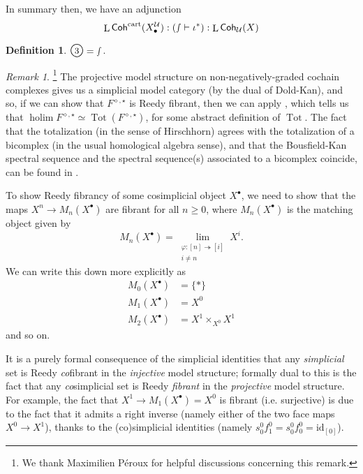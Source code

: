 \documentclass[11pt,fleqn]{article}
\theoremstyle{plain}
\theoremstyle{definition}
\newtheorem{definition}[theorem]{Definition}
\theoremstyle{remark}
\newtheorem{remark}[theorem]{Remark}
\numberwithin{equation}{theorem}
\newcommand{\cover}{\mathcal{U}}
\newcommand{\anotherbullet}{\star}
\newcommand{\yetanotherbullet}{\diamond}
\newcommand{\id}{\mathrm{id}}
\newcommand{\gcohUX}{\mathsf{Coh}_{\cover}(X)}
\newcommand{\cartcohX}{\mathsf{Coh}^\mathrm{cart}(X_\bullet^\cover)}
\newcommand{\numberincircle}[1]{\text{\normalfont\Large\textcircled{\small #1}}}
\DeclareMathOperator{\Tot}{Tot}
\DeclareMathOperator{\LL}{L}
\DeclareMathOperator{\holim}{holim}
\begin{document}
        \medskip

        In summary then, we have an adjunction
        \begin{equation}
        \label{equation:adjunction-of-localisations}
            \LL{\cartcohX}:(\smallint\vdash\iota^*):\LL{\gcohUX}
        \end{equation}

        \begin{definition}\label{definition:defining-numberincircle3}
            $\numberincircle{3}=\smallint$.
        \end{definition}

        \begin{remark}\label{remark:reedy-totalisation-etc}\footnote{We thank Maximilien Péroux for helpful discussions concerning this remark.}
            The projective model structure on non-negatively-graded cochain complexes gives us a simplicial model category (by the dual of Dold-Kan), and so, if we can show that $F^{\yetanotherbullet,\anotherbullet}$ is Reedy fibrant, then we can apply \cite[Theorem~19.8.7]{Hirschhorn2003}, which tells us that $\holim F^{\yetanotherbullet,\anotherbullet}\simeq\Tot(F^{\yetanotherbullet,\anotherbullet})$, for some abstract definition of $\Tot$.
            The fact that the totalization (in the sense of Hirschhorn) agrees with the totalization of a bicomplex (in the usual homological algebra sense), and that the Bousfield-Kan spectral sequence and the spectral sequence(s) associated to a bicomplex coincide, can be found in \cite[{}III.1.1.13]{Fresse2017}.

            To show Reedy fibrancy of some cosimplicial object $X^\bullet$, we need to show that the maps $X^n\to M_n(X^\bullet)$ are fibrant for all $n\geqslant0$, where $M_n(X^\bullet)$ is the {matching object} given by
            \[
                M_n(X^\bullet)
                =
                \lim_{\substack{\varphi\colon[n]\twoheadrightarrow[i] \\ i\neq n}} X^i.
            \]
            We can write this down more explicitly as
            \begin{align*}
                M_0(X^\bullet)
                &=
                \{*\}
            \\  M_1(X^\bullet)
                &=
                X^0
            \\  M_2(X^\bullet)
                &=
                X^1 \times_{X^0} X^1
            \end{align*}
            and so on.

            It is a purely formal consequence of the simplicial identities that any \emph{simplicial} set is Reedy \emph{co}fibrant in the \emph{injective} model structure; formally dual to this is the fact that any \emph{co}simplicial set is Reedy \emph{fibrant} in the \emph{projective} model structure.
            For example, the fact that $X^1\to M_1(X^\bullet)=X^0$ is fibrant (i.e. surjective) is due to the fact that it admits a right inverse (namely either of the two face maps $X^0\to X^1$), thanks to the (co)simplicial identities (namely $s_0^0 f_1^0 = s_0^0 f_0^0 = \id_{[0]}$).
        \end{remark}
\end{document}
